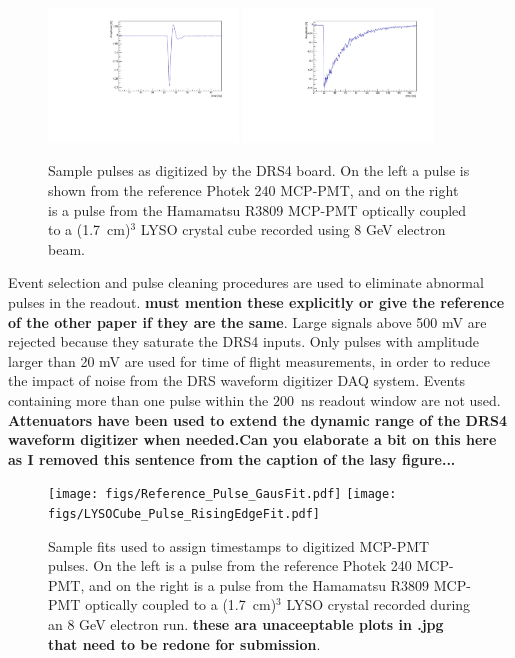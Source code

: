 \documentclass[12pt]{article}
\begin{document}
\begin{figure}[h] \centering
\includegraphics[width=0.45\textwidth]{figs/RefPulse} 
\includegraphics[width=0.45\textwidth]{figs/run064_event506} 
\caption{\small Sample pulses as digitized by the DRS4 board. 
On the left a  pulse is shown from the reference Photek 240 MCP-PMT, 
and on the right is a pulse from the Hamamatsu R3809 MCP-PMT
optically coupled to a (1.7~cm)$^{3}$ LYSO crystal cube
recorded using  8 GeV electron beam.} 
\label{fig:PulseShapes}
\end{figure}

Event selection and pulse cleaning procedures are used to eliminate abnormal
pulses in the readout. {\bf must mention these explicitly or give the reference of the other paper if they are the same}.
Large signals above 500 mV are rejected because they
saturate the DRS4 inputs. Only pulses with amplitude larger than 20 mV are used
for time of flight measurements, in order to reduce the impact of noise from the
DRS waveform digitizer DAQ system. Events containing more than one pulse within
the $200$~ns readout window are not used. {\bf Attenuators have been used to extend the dynamic range of the DRS4 waveform digitizer when needed.Can you elaborate a bit on this here as I removed this sentence from the caption of the lasy figure...}

\begin{figure}[h] \centering
\texttt{[image: figs/Reference\_Pulse\_GausFit.pdf]} 
\texttt{[image: figs/LYSOCube\_Pulse\_RisingEdgeFit.pdf]} 
\caption{\small Sample fits used to assign timestamps to digitized MCP-PMT pulses. 
On the left is a pulse from the reference Photek 240 MCP-PMT, and
on the right is a pulse from the Hamamatsu R3809 MCP-PMT
optically coupled to a (1.7~cm)$^{3}$  LYSO crystal
recorded during an 8 GeV electron run. {\bf these ara unaceeptable plots in .jpg that need to be redone for submission}.}
\label{fig:PulseFits}
\end{figure}
\end{document}
